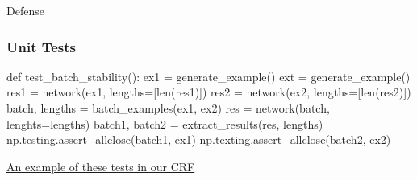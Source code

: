 \documentclass{beamer}
\begin{document}
\begin{section}{Defense}

\begin{frame}[fragile]
    \frametitle{Unit Tests}
    \begin{pythoncode}
def test_batch_stability():
    ex1 = generate_example()
    ext = generate_example()
    res1 = network(ex1, lengths=[len(res1)])
    res2 = network(ex2, lengths=[len(res2)])
    batch, lengths = batch_examples(ex1, ex2)
    res = network(batch, lenghts=lengths)
    batch1, batch2 = extract_results(res, lengths)
    np.testing.assert_allclose(batch1, ex1)
    np.texting.assert_allclose(batch2, ex2)
    \end{pythoncode}

    \href{https://github.com/dpressel/mead-baseline/blob/f98e64afcbab8a267fce5d13a434a981aa564d27/python/tests/test_crf_pytorch.py#L265}{An
    example of these tests in our CRF}

\end{frame}

\end{section}
\end{document}
